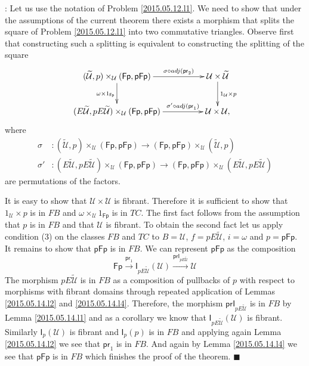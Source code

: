 \documentclass[12pt]{article}
\numberwithin{equation}{section}
\newenvironment{myproof}{{\bf Proof}:}{$\blacksquare$ \vskip 5mm }
\newcommand{\sr}{\rightarrow}
\newcommand{\wt}{\widetilde}
\newcommand{\id}{1}            %
\newcommand{\U}{\mathcal{U}}
\newcommand{\I}{\mathsf{I}}
\newcommand{\Fp}{\mathsf{Fp}}
\newcommand{\pFp}{\mathsf{pFp}}
\newcommand{\pr}{\mathsf{pr}}
\newcommand{\prI}{\mathsf{prI}}
\begin{document}
\begin{myproof}
Let us use the notation of Problem \ref{2015.05.12.l1}. We need to show that
under the assumptions of the current theorem there exists a morphism that
splits the square of Problem \ref{2015.05.12.l1} into two commutative
triangles. Observe first that constructing such a splitting is equivalent to
constructing the splitting of the square
%
$$
\begin{xy}
          \xymatrix@C=4pc{ (\wt{\U},p)\times_\U (\Fp,\pFp) \ar[r]^-{\sigma\circ
              adj(\pr_2)} \ar[d]_{\omega \times \id_{\Fp}} & \U\times\wt{\U}
            \ar[d]^{\id_\U\times p}\\ (E\wt{\U},pE\wt{\U})\times_\U (\Fp,\pFp)
            \ar[r]^-{\sigma'\circ adj(\pr_1)} & \U\times \U, }
\end{xy}
$$
%
where
%
\begin{align*}
  \sigma & :(\wt{\U},p)\times_\U (\Fp,\pFp)\sr (\Fp,\pFp)\times_\U (\wt{\U},p) \\
  \sigma'& :(E\wt{\U},pE\wt{\U})\times_\U (\Fp,\pFp) \sr (\Fp,\pFp) \times_\U (E\wt{\U},pE\wt{\U})
\end{align*}
%
are permutations of the factors.

It is easy to show that $\U\times \U$ is fibrant. Therefore it is sufficient to
show that $\id_\U\times p$ is in $FB$ and $\omega\times_\U \id_{\Fp}$ is in
$TC$. The first fact follows from the assumption that $p$ is in $FB$ and that
$\U$ is fibrant. To obtain the second fact let us apply condition (3) on the
classes $FB$ and $TC$ to $B=\U$, $f=pE\wt{\U}$, $i=\omega$ and $p=\pFp$.  It
remains to show that $\pFp$ is in $FB$. We can represent $\pFp$ as the
composition
%
$$\Fp\stackrel{\pr_1}{\sr} \I_{pE\wt{\U}}(\U) \stackrel{\prI_{pE\wt{\U}}}{\sr} \U$$
%
The morphism $pE\wt{\U}$ is in $FB$ as a composition of pullbacks of $p$ with
respect to morphisms with fibrant domains through repeated application of
Lemmas \ref{2015.05.14.l2} and \ref{2015.05.14.l4}. Therefore, the morphism
$\prI_{pE\wt{\U}}$ is in $FB$ by Lemma \ref{2015.05.14.l1} and as a corollary we
know that $\I_{pE\wt{\U}}(\U)$ is fibrant. Similarly $\I_p(\U)$ is fibrant and
$\I_p(p)$ is in $FB$ and applying again Lemma \ref{2015.05.14.l2} we see that
$\pr_1$ is in $FB$. And again by Lemma \ref{2015.05.14.l4} we see that $\pFp$ is
in $FB$ which finishes the proof of the theorem.
\end{myproof}
%
\end{document}
